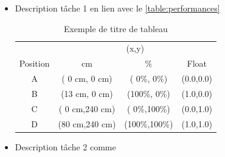 \documentclass[12pt, a4paper]{article}
\begin{document}
\begin{itemize}
    \item Description tâche 1 en lien avec le \autoref{table:performances}

          \begin{table}[!h]
              \centering
              \caption{Exemple de titre de tableau}
              \label{table:performances}
              \begin{tabular}{c|ccc}
                           & \multicolumn{3}{c}{(x,y)}                             \\
                  Position & cm                        & \%            & Float     \\
                  \hline
                  A        & ( 0 cm,  0 cm)            & (  0\%,  0\%) & (0.0,0.0) \\
                  B        & (13 cm,  0 cm)            & (100\%,  0\%) & (1.0,0.0) \\
                  C        & ( 0 cm,240 cm)            & (  0\%,100\%) & (0.0,1.0) \\
                  D        & (80 cm,240 cm)            & (100\%,100\%) & (1.0,1.0) \\
              \end{tabular}
          \end{table}

    \item Description tâche 2 comme \citep{Zhang2018LSTM}
\end{itemize}



\end{document}
